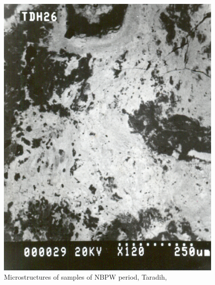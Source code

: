 \begin{figure}[H]
\renewcommand{\thefigure}{26A}
\includegraphics[scale=0.65]{images/chapter-4/fig026A.jpg}
\caption{Microstructures of samples of NBPW period, Taradih,}\label{chapter-4-fig26A}
\end{figure}


